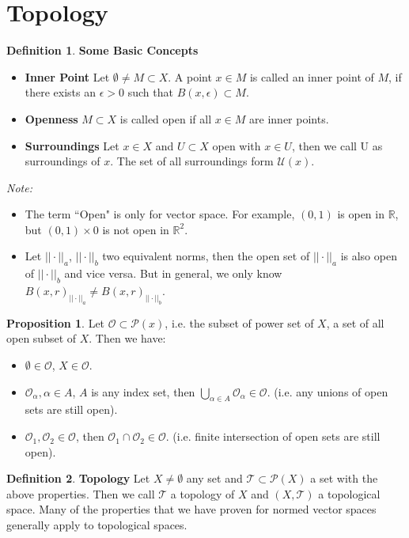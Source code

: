\documentclass{article}
\theoremstyle{definition}
\newtheorem{defi}{Definition}[subsection]
\newtheorem{prop}{Proposition}[subsection]
\begin{document}
\section{Topology}
\begin{defi}
\textbf{Some Basic Concepts}
\begin{itemize}
    \item \textbf{Inner Point} Let $\emptyset \neq M \subset X$. A point $x\in M$ is called an inner point of $M$, if there exists an $\epsilon>0$ such that $B(x,\epsilon)\subset M$.
    \item \textbf{Openness} $M\subset X$ is called open if all $x\in M$ are inner points.
    \item \textbf{Surroundings} Let $x\in X$ and $U \subset X$ open with $x\in U$, then we call U as surroundings of $x$. The set of all surroundings form $\mathcal{U}(x)$.
\end{itemize}
\end{defi}
\textit{Note:} 
\begin{itemize}
    \item The term ``Open" is only for vector space. For example, $(0,1)$ is open in $\mathbb{R}$, but $(0,1)\times {0}$ is not open in $\mathbb{R}^2$.
    \item Let $||\cdot||_a$, $||\cdot||_b$ two equivalent norms, then the open set of $||\cdot||_a$ is also open of $||\cdot||_b$ and vice versa. But in general, we only know $B(x,r)_{||\cdot||_a} \neq B(x,r)_{||\cdot||_b}$.
\end{itemize}
\begin{prop}
Let $\mathcal{O}\subset\mathcal{P}(x)$, i.e. the subset of power set of $X$, a set of all open subset of $X$. Then we have:
\begin{itemize}
    \item $\emptyset \in\mathcal{O}$, $X\in\mathcal{O}$.
    \item $\mathcal{O}_{\alpha}, \alpha \in A$, $A$ is any index set, then $\bigcup_{\alpha\in A}\mathcal{O}_{\alpha}\in\mathcal{O}$. (i.e. any unions of open sets are still open).
    \item $\mathcal{O}_1, \mathcal{O}_2 \in \mathcal{O}$, then $\mathcal{O}_1 \cap \mathcal{O}_2\in\mathcal{O}$. (i.e. finite intersection of open sets are still open).
\end{itemize}
\end{prop}
\begin{defi}
\textbf{Topology} Let $X\neq \emptyset$ any set and $\mathcal{T}\subset \mathcal{P}(X)$ a set with the above properties. Then we call $\mathcal{T}$ a topology of $X$ and $(X,\mathcal{T})$ a topological space. Many of the properties that we have proven for normed vector spaces generally apply to topological spaces.
\end{defi}
\end{document}
